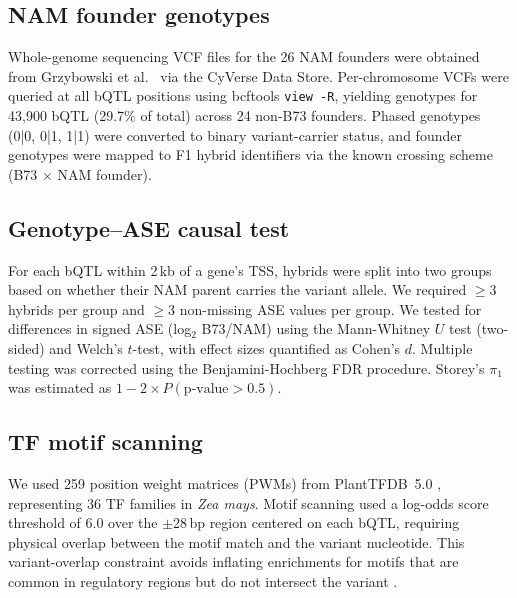 \documentclass[10pt,letterpaper]{article}
\begin{document}
\subsection*{NAM founder genotypes}

Whole-genome sequencing VCF files for the 26 NAM founders were obtained from
Grzybowski et al.\ \cite{grzybowski2023} via the CyVerse Data Store. Per-chromosome
VCFs were queried at all bQTL positions using bcftools
\texttt{view -R}, yielding genotypes for 43,900 bQTL (29.7\% of total)
across 24 non-B73 founders. Phased genotypes (0|0, 0|1, 1|1) were converted
to binary variant-carrier status, and founder genotypes were mapped to F1
hybrid identifiers via the known crossing scheme (B73 $\times$ NAM founder).

\subsection*{Genotype--ASE causal test}

For each bQTL within 2\,kb of a gene's TSS, hybrids were split into two
groups based on whether their NAM parent carries the variant allele. We
required $\geq 3$ hybrids per group and $\geq 3$ non-missing ASE values
per group. We tested for differences in signed ASE (log$_2$ B73/NAM) using
the Mann-Whitney $U$ test (two-sided) and Welch's $t$-test, with effect
sizes quantified as Cohen's $d$. Multiple testing was corrected using the
Benjamini-Hochberg FDR procedure. Storey's $\pi_1$ was estimated as
$1 - 2 \times P(\text{p-value} > 0.5)$.

\subsection*{TF motif scanning}

We used 259 position weight matrices (PWMs) from PlantTFDB~5.0
\cite{tian2020}, representing 36 TF families in \emph{Zea mays}. Motif
scanning used a log-odds score threshold of 6.0 over the $\pm$28\,bp region
centered on each bQTL, requiring physical overlap between the motif match
and the variant nucleotide. This variant-overlap constraint avoids inflating
enrichments for motifs that are common in regulatory regions but do not
intersect the variant \cite{banf2025}.
\end{document}
